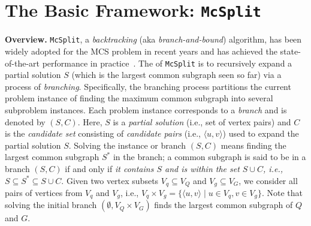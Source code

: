 \section{The Basic Framework: \texttt{McSplit}}
\label{sec:sota}

{\cheng \noindent\textbf{Overview.} \texttt{McSplit},  a \emph{backtracking} (aka \textit{branch-and-bound}) algorithm,  has been widely adopted for the MCS problem in recent years and has achieved the state-of-the-art performance in practice~\cite{bai2021glsearch,liu2020learning,zhoustrengthened,liu2023hybrid}.}
%
The  of \texttt{McSplit} is to recursively expand a partial solution $S$ (which is {\cheng the largest} common subgraph {\cheng seen so far}) via a process of \emph{branching}. Specifically, the branching process partitions the current problem instance of finding the maximum common subgraph into several subproblem instances. Each problem instance {\cheng corresponds} to a \emph{branch} {\cheng and} is denoted by $(S,C)$. Here, $S$ is a \emph{partial solution} {\Yui (i.e., set of vertex pairs)} and $C$ is the \emph{candidate set} consisting of \emph{candidate pairs} (i.e., $\langle u, v\rangle$) used to expand the partial solution $S$. Solving the instance or branch $(S,C)$ means finding the largest common subgraph $S^*$ in the branch; a common subgraph is said to be in a branch $(S,C)$ if and only if \emph{it contains $S$ and is within the set $S\cup C$, {\Yui i.e., $S\subseteq S^*\subseteq S\cup C$}}.
{\Yui Given two vertex subsets $V_q\subseteq V_Q$ and $V_g\subseteq V_G$, we consider all pairs of   vertices from $V_q$ and $V_g$, i.e.,
$V_q\times V_g = \{\langle u,v \rangle\mid u\in V_q, v\in V_g\}$.
%
%
Note that solving the initial branch $(\emptyset,V_Q\times V_G)$ finds the largest common subgraph of $Q$ and $G$.}

